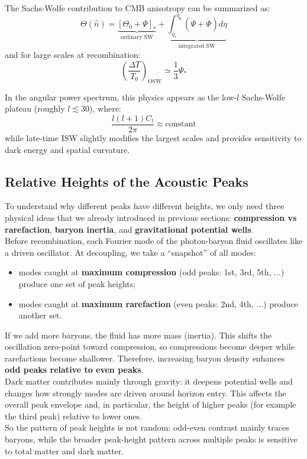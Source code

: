 \bigskip \noindent
\begin{theory}
    The Sachs-Wolfe contribution to CMB anisotropy can be summarized as:
    \[
        \Theta(\hat{n})
        = \underbrace{\left[\Theta_0 + \Psi\right]_*}_{\text{ordinary SW}}
        + \underbrace{\int_{\eta_*}^{\eta_0} (\dot{\Psi}+\dot{\Phi}) d\eta}_{\text{integrated SW}}
    \]
    and for large scales at recombination:
    \[
        \left(\frac{\Delta T}{T_0}\right)_{\mathrm{OSW}} \simeq \frac{1}{3}\Psi_*
    \]

    In the angular power spectrum, this physics appears as the low-$l$ Sachs-Wolfe plateau (roughly $l \lesssim 30$), where:
    \[
        \frac{l(l+1)C_l}{2\pi} \approx \text{constant}
    \]
    while late-time ISW slightly modifies the largest scales and provides sensitivity to dark energy and spatial curvature.
\end{theory}

\bigskip \noindent \bigskip \noindent \bigskip \noindent
\subsection{Relative Heights of the Acoustic Peaks}
\begin{intuition}
    To understand why different peaks have different heights, we only need three physical ideas that we already introduced in previous sections: \textbf{compression vs rarefaction}, \textbf{baryon inertia}, and \textbf{gravitational potential wells}. \\

    Before recombination, each Fourier mode of the photon-baryon fluid oscillates like a driven oscillator. At decoupling, we take a ``snapshot'' of all modes:
    \begin{itemize}
        \item modes caught at \textbf{maximum compression} (odd peaks: 1st, 3rd, 5th, ...) produce one set of peak heights;
        \item modes caught at \textbf{maximum rarefaction} (even peaks: 2nd, 4th, ...) produce another set.
    \end{itemize}

    If we add more baryons, the fluid has more mass (inertia). This shifts the oscillation zero-point toward compression, so compressions become deeper while rarefactions become shallower. Therefore, increasing baryon density enhances \textbf{odd peaks relative to even peaks}. \\

    Dark matter contributes mainly through gravity: it deepens potential wells and changes how strongly modes are driven around horizon entry. This affects the overall peak envelope and, in particular, the height of higher peaks (for example the third peak) relative to lower ones. \\

    So the pattern of peak heights is not random: odd-even contrast mainly traces baryons, while the broader peak-height pattern across multiple peaks is sensitive to total matter and dark matter.
\end{intuition}

